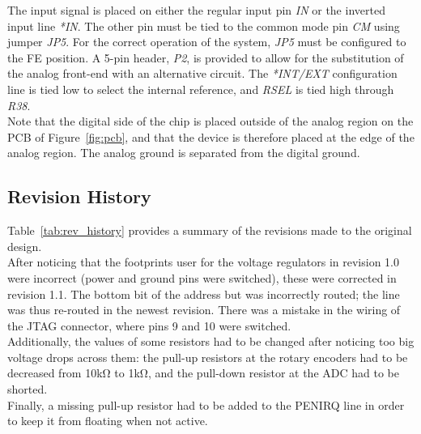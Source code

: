 \documentclass{scrartcl}
\begin{document}
	The input signal is placed on either the regular input pin \textit{IN} or the inverted input line \textit{*IN}. The other pin must be tied to the common mode pin \textit{CM} using jumper \textit{JP5}. For the correct operation of the system, \textit{JP5} must be configured to the FE position. A 5-pin header, \textit{P2}, is provided to allow for the substitution of the analog front-end with an alternative circuit. The \textit{*INT/EXT} configuration line is tied low to select the internal reference, and \textit{RSEL} is tied high through \textit{R38}.\\

	Note that the digital side of the chip is placed outside of the analog region on the PCB of Figure~\ref{fig:pcb}, and that the device is therefore placed at the edge of the analog region. The analog ground is separated from the digital ground.\\

	\subsection{Revision History}
	Table~\ref{tab:rev_history} provides a summary of the revisions made to the original design.\\

	After noticing that the footprints user for the voltage regulators in revision 1.0 were incorrect (power and ground pins were switched), these were corrected in revision 1.1. The bottom bit of the address but was incorrectly routed; the line was thus re-routed in the newest revision. There was a mistake in the wiring of the JTAG connector, where pins 9 and 10 were switched.\\

	Additionally, the values of some resistors had to be changed after noticing too big voltage drops across them: the pull-up resistors at the rotary encoders had to be decreased from 10kΩ to 1kΩ, and the pull-down resistor at the ADC had to be shorted.\\

	Finally, a missing pull-up resistor had to be added to the PENIRQ line in order to keep it from floating when not active.\\
\end{document}
